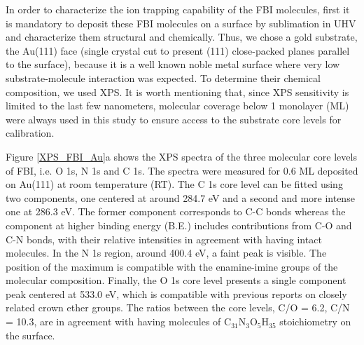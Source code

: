 \documentclass[aps,prl,reprint,longbibliography,superscriptaddress, english]{revtex4-1}
\begin{document}
In order to characterize the ion trapping capability of the FBI molecules, first it is mandatory to deposit these FBI molecules on a surface by sublimation in UHV and characterize them structural and chemically. Thus, we chose a gold substrate, the Au(111) face (single crystal cut to present (111) close-packed planes parallel to the surface), because it is a well known noble metal surface where very low substrate-molecule interaction was expected. To determine their chemical composition, we used XPS. It is worth mentioning that, since XPS sensitivity is limited to the last few nanometers, molecular coverage below 1 monolayer (ML) were always used in this study to ensure access to the substrate core levels for calibration. 

Figure {\ref{XPS_FBI_Au}}a shows the XPS spectra of the three molecular core levels of FBI, i.e. O 1s, N 1s and C 1s. The spectra were measured for 0.6 ML deposited on Au(111) at room temperature (RT). The C 1s core level can be fitted using two components, one {centered} at around 284.7 eV and a second and more intense one at 286.3 eV. The former component corresponds to C-C bonds whereas the component at higher binding energy (B.E.) includes contributions from C-O and C-N bonds, with their relative intensities in agreement with having intact molecules. In the N 1s region, around 400.4 eV, a faint peak is visible. The position of the maximum is compatible with the {enamine-imine} groups of the molecular composition. Finally, the O 1s core level presents a single component peak centered at 533.0 eV, which is compatible with previous reports on closely related crown ether groups\cite{stredansky_-surface_2019}. The ratios between the core levels, C/O = 6.2, C/N = 10.3, are in agreement with having molecules of $ \mathrm{C_{31}N_{3}O_{5}H_{35}}$ stoichiometry on the surface. 
\end{document}
